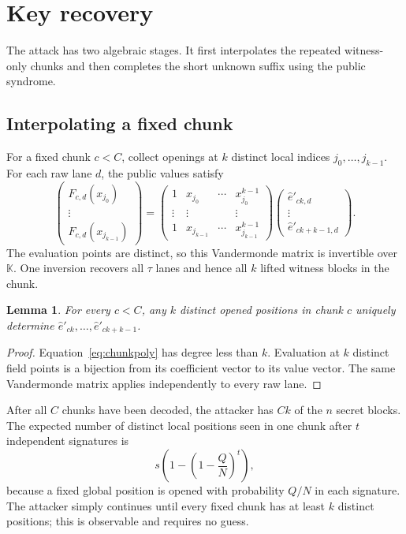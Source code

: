 \documentclass[11pt,a4paper]{article}
\newtheorem{lemma}[theorem]{Lemma}
\newcommand{\F}{\mathbb{F}}
\newcommand{\K}{\mathbb{K}}
\begin{document}
\section{Key recovery}
\label{sec:attack}

The attack has two algebraic stages.  It first interpolates the repeated
witness-only chunks and then completes the short unknown suffix using the
public syndrome.

\subsection{Interpolating a fixed chunk}

For a fixed chunk $c<C$, collect openings at $k$ distinct local indices
$j_0,\ldots,j_{k-1}$.  For each raw lane $d$, the public values satisfy
\[
 \begin{pmatrix}
 F_{c,d}(x_{j_0})\\[-1mm]\vdots\\F_{c,d}(x_{j_{k-1}})
 \end{pmatrix}
 =
 \begin{pmatrix}
 1&x_{j_0}&\cdots&x_{j_0}^{k-1}\\
 \vdots&\vdots&&\vdots\\
 1&x_{j_{k-1}}&\cdots&x_{j_{k-1}}^{k-1}
 \end{pmatrix}
 \begin{pmatrix}
 \widehat e'_{ck,d}\\[-1mm]\vdots\\\widehat e'_{ck+k-1,d}
 \end{pmatrix}.
\]
The evaluation points are distinct, so this Vandermonde matrix is invertible
over $\K$.  One inversion recovers all $\tau$ lanes and hence all $k$ lifted
witness blocks in the chunk.

\begin{lemma}
For every $c<C$, any $k$ distinct opened positions in chunk $c$ uniquely
determine $\widehat e'_{ck},\ldots,\widehat e'_{ck+k-1}$.
\end{lemma}

\begin{proof}
Equation~\eqref{eq:chunkpoly} has degree less than $k$.  Evaluation at $k$
distinct field points is a bijection from its coefficient vector to its value
vector.  The same Vandermonde matrix applies independently to every raw lane.
\end{proof}

After all $C$ chunks have been decoded, the attacker has $Ck$ of the $n$
secret blocks.  The expected number of distinct local positions seen in one
chunk after $t$ independent signatures is
\begin{equation}
             s\left(1-\left(1-\frac{Q}{N}\right)^t\right),
\label{eq:coverage}
\end{equation}
because a fixed global position is opened with probability $Q/N$ in each
signature.  The attacker simply continues until every fixed chunk has at
least $k$ distinct positions; this is observable and requires no guess.
\end{document}
